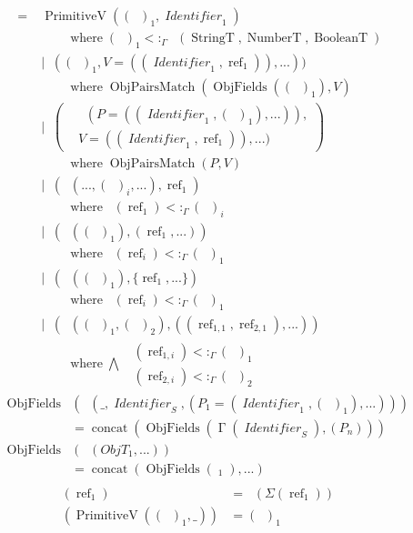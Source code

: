 \documentclass[12pt]{article}
\DeclareMathOperator{\StringT}{StringT}
\DeclareMathOperator{\NumberT}{NumberT}
\DeclareMathOperator{\BooleanT}{BooleanT}
\DeclareMathOperator{\RecT}{RecT_\Gamma}
\DeclareMathOperator{\ObjT}{ObjT_\Gamma}
\DeclareMathOperator{\ListT}{ListT_\Gamma}
\DeclareMathOperator{\SetT}{SetT_\Gamma}
\DeclareMathOperator{\MapT}{MapT_\Gamma}
\DeclareMathOperator{\UnionT}{UnionT_\Gamma}
\DeclareMathOperator{\InterT}{InterT_\Gamma}
\DeclareMathOperator{\LookupObjRef}{\Gamma}
\DeclareMathOperator{\Identifier}{\textit{Identifier}}
\DeclareMathOperator{\Type}{{\textit{Type}_\Gamma}}
\DeclareMathOperator{\Value}{\textit{Value}_{\Gamma, \Sigma}}
\DeclareMathOperator{\PrimitiveV}{PrimitiveV}
\DeclareMathOperator{\RecV}{RecV_{\Gamma, \Sigma}}
\DeclareMathOperator{\ObjV}{ObjV_{\Gamma, \Sigma}}
\DeclareMathOperator{\ListV}{ListV_{\Gamma, \Sigma}}
\DeclareMathOperator{\SetV}{SetV_{\Gamma, \Sigma}}
\DeclareMathOperator{\MapV}{MapV_{\Gamma, \Sigma}}
\DeclareMathOperator{\UnionV}{UnionV_{\Gamma, \Sigma}}
\DeclareMathOperator{\ValueType}{ValueType_{\Gamma, \Sigma}}
\DeclareMathOperator{\textref}{ref}
\DeclareMathOperator{\ObjFields}{ObjFields}
\DeclareMathOperator{\ObjPairsMatch}{ObjPairsMatch}
\DeclareMathOperator{\where}{ where }
\newcommand{\ValueRef}{\textref}
\newcommand{\ValueDeref}[1]{\Sigma(#1)}
\newcommand{\subtype}{<:_\Gamma}
\begin{document}
\newcommand{\newlinewhere}{\\&\quad\quad\where}

\begin{figure}
\begin{mdframed}
\begin{align*}
    \Value =& \PrimitiveV((\Type)_1, \Identifier_1) 
    \newlinewhere (\Type)_1 \subtype \UnionT(\StringT, \NumberT, \BooleanT)  \\
    &| \ObjV((\Type)_1, V=((\Identifier_1, \ValueRef_1)), ...)) \newlinewhere
    \ObjPairsMatch(\ObjFields((\Type)_1), V) \\
    &| \RecV\left(\begin{aligned}
        &\RecT(P=((\Identifier_1, (\Type)_1), ...)),\\&V=((\Identifier_1, \ValueRef_1)), ...)
    \end{aligned}\right) \newlinewhere
    \ObjPairsMatch(P, V) \\
    &| \UnionV(\UnionT(..., (\Type)_i, ...), \ValueRef_1) \newlinewhere
    \ValueType(\ValueRef_1) \subtype (\Type)_i\\
    &| \ListV(\ListT((\Type)_1), (\ValueRef_1, ...)) \newlinewhere \ValueType(\ValueRef_i) \subtype (\Type)_1 \\
    &| \SetV(\SetT((\Type)_1), \{\ValueRef_1, ...\}) \newlinewhere \ValueType(\ValueRef_i) \subtype (\Type)_1 \\
    &| \MapV(\MapT((\Type)_1, (\Type)_2), ((\ValueRef_{1,1}, \ValueRef_{2,1}), ...)) \newlinewhere \bigwedge
    \begin{aligned}
        \ValueType(\ValueRef_{1, i}) \subtype (\Type)_1 \\
        \ValueType(\ValueRef_{2, i}) \subtype (\Type)_2 
    \end{aligned}
\end{align*}
\begin{align*}
    \ObjFields&(\ObjT(\_, \Identifier_S, (P_1 = (\Identifier_1, (\Type)_1), ...))) \\&= \operatorname{concat}(\ObjFields(\LookupObjRef(\Identifier_S), (P_n))) \\
    \ObjFields&(\InterT(ObjT_1, ...)) \\&= \operatorname{concat}(\ObjFields(\ObjT_1), ...) \\
\end{align*}
\begin{align*}
    \ValueType(\ValueRef_1) &= \ValueType(\ValueDeref{\ValueRef_1}) \\
    \ValueType(\PrimitiveV((\Type)_1, \_)) &= (\Type)_1 \\

\end{align*}
\end{mdframed}
\end{figure}
\end{document}

